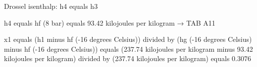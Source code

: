Drossel isenthalp: h4 equals h3  

h4 equals hf (8 bar) equals 93.42 kilojoules per kilogram → TAB A11  

x1 equals (h1 minus hf (-16 degrees Celsius)) divided by (hg (-16 degrees Celsius) minus hf (-16 degrees Celsius)) equals (237.74 kilojoules per kilogram minus 93.42 kilojoules per kilogram) divided by (237.74 kilojoules per kilogram) equals 0.3076